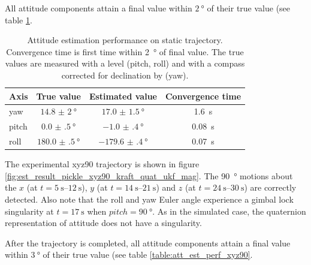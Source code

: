 \documentclass[conference]{IEEEtran}
\begin{document}
All attitude components attain a final value within $\SI{2}{\degree}$ of their true value (see table \ref{table:att_est_perf}.\\

\begin{table}[!t]
    \renewcommand{\arraystretch}{1.3}
    \caption{Attitude estimation performance on static trajectory. Convergence time is first time within \SI{2}{\degree} of final value. The true values are measured with a level (pitch, roll) and with a compass corrected for declination by \cite{wmm} (yaw).}
    \label{table:att_est_perf}
    \centering
    \begin{tabular}{|l|c|c|c|}
        \hline
        Axis & True value & Estimated value & Convergence time \\
        \hline
        yaw & $\SI[separate-uncertainty = true]{14.8(20)}{\degree}$ & $\SI[separate-uncertainty = true]{17.0(15)}{\degree}$ & \SI{1.6}{\second} \\
        \hline
        pitch & $\SI[separate-uncertainty = true]{0.0(5)}{\degree}$ & $\SI[separate-uncertainty = true]{-1.0(4)}{\degree}$ & \SI{0.08}{\second} \\
        \hline
        roll & $\SI[separate-uncertainty = true]{180.0(5)}{\degree}$ & $\SI[separate-uncertainty = true]{-179.6(4)}{\degree}$ & \SI{0.07}{\second} \\
        \hline
    \end{tabular}
\end{table}

The experimental xyz90 trajectory is shown in figure \ref{fig:est_result_pickle_xyz90_kraft_quat_ukf_mag}. The \SI{90}{\degree} motions about the $x$ (at $t = \SIrange{5}{12}{\second}$), $y$ (at $t = \SIrange{14}{21}{\second}$) and $z$ (at $t = \SIrange{24}{30}{\second}$) are correctly detected. Also note that the roll and yaw Euler angle experience a gimbal lock singularity at $t = \SI{17}{\second}$ when $pitch=\SI{90}{\degree}$. As in the simulated case, the quaternion representation of attitude does not have a singularity.

After the trajectory is completed, all attitude components attain a final value within $\SI{3}{\degree}$ of their true value (see table \ref{table:att_est_perf_xyz90}.\\
\end{document}
